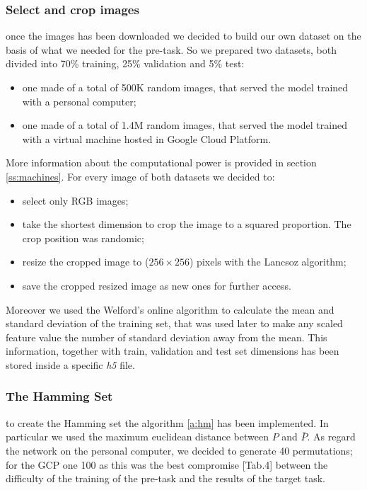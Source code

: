 \subsubsection{Select and crop images}\label{sss:select_crop_image}
once the images has been downloaded we decided to build our own dataset on the basis of what we needed for the pre-task. So we prepared two datasets, both divided into 70\% training, 25\% validation and 5\% test:
\begin{itemize}
    \item one made of a total of 500K random images, that served the model trained with a personal computer;
    \item one made of a total of 1.4M random images, that served the model trained with a virtual machine hosted in Google Cloud Platform.
\end{itemize}
More information about the computational power is provided in section \ref{ss:machines}. For every image of both datasets we decided to:
\begin{itemize}
    \item select only RGB images;
    \item take the shortest dimension to crop the image to a squared proportion. The crop position was randomic;
    \item resize the cropped image to ($256 \times 256$) pixels with the Lancsoz algorithm;
    \item save the cropped resized image as new ones for further access.
\end{itemize}
Moreover we used the Welford's online algorithm \cite{Welford_online_algorithm} to calculate the mean and standard deviation of the training set, that was used later to make any scaled feature value the number of standard deviation away from the mean. This information, together with train, validation and test set dimensions has been stored inside a specific \emph{h5} file.

\subsubsection{The Hamming Set}
to create the Hamming set the algorithm \ref{a:hm} has been implemented. In particular we used the maximum euclidean distance between $P$ and $\bar{P}$. As regard the network on the personal computer, we decided to generate 40 permutations; for the GCP one 100 as this was the best compromise \cite{Noroozi_2016}[Tab.4] between the difficulty of the training of the pre-task and the results of the target task.

